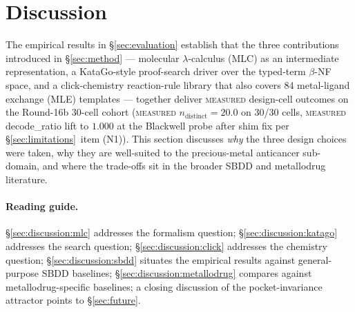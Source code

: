 %
%

\section{Discussion}
\label{sec:discussion}

The empirical results in \S\ref{sec:evaluation} establish that the
three contributions introduced in \S\ref{sec:method} --- molecular
$\lambda$-calculus (MLC) as an intermediate representation, a
KataGo-style proof-search driver over the typed-term $\beta$-NF
space, and a click-chemistry reaction-rule library that also covers
84 metal-ligand exchange (MLE) templates --- together deliver
\textsc{measured} design-cell outcomes on the Round-16b 30-cell
cohort (\textsc{measured} $n_{\text{distinct}} = 20.0$ on 30/30
cells, \textsc{measured} decode\_ratio lift to $1.000$ at the
Blackwell probe after shim fix per \S\ref{sec:limitations}~item
(N1)). This section discusses \emph{why} the three design choices
were taken, why they are well-suited to the precious-metal
anticancer sub-domain, and where the trade-offs sit in the broader
SBDD and metallodrug literature.

\paragraph{Reading guide.}
\S\ref{sec:discussion:mlc} addresses the formalism question;
\S\ref{sec:discussion:katago} addresses the search question;
\S\ref{sec:discussion:click} addresses the chemistry question;
\S\ref{sec:discussion:sbdd} situates the empirical results against
general-purpose SBDD baselines; \S\ref{sec:discussion:metallodrug}
compares against metallodrug-specific baselines; a closing
discussion of the pocket-invariance attractor points to
\S\ref{sec:future}.


